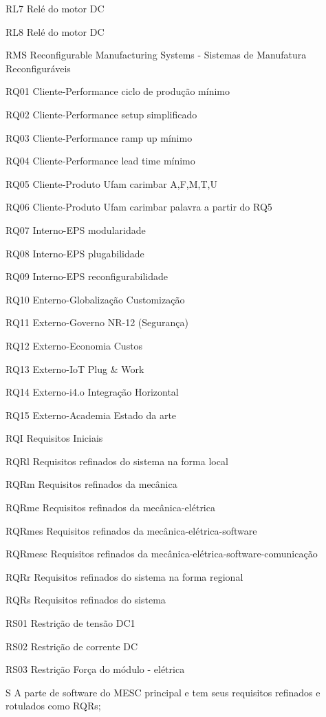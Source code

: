\documentclass[
12pt,				%
openright,			%
oneside,			%
a4paper,			%
english,			%
brazil				%
]{abntex2}
\begin{document}
\begin{siglas}
\item[RL7] Relé do motor DC
\item[RL8] Relé do motor DC
\item[RMS] Reconfigurable Manufacturing Systems - Sistemas de Manufatura Reconfiguráveis
\item[RQ01] Cliente-Performance ciclo de produção mínimo 
\item[RQ02] Cliente-Performance setup simplificado 
\item[RQ03] Cliente-Performance ramp up mínimo 
\item[RQ04] Cliente-Performance lead time mínimo 
\item[RQ05] Cliente-Produto Ufam carimbar A,F,M,T,U 
\item[RQ06] Cliente-Produto Ufam carimbar palavra a partir do RQ5 
\item[RQ07] Interno-EPS modularidade 
\item[RQ08] Interno-EPS plugabilidade 
\item[RQ09] Interno-EPS reconfigurabilidade 
\item[RQ10] Enterno-Globalização Customização 
\item[RQ11] Externo-Governo NR-12 (Segurança)
\item[RQ12] Externo-Economia Custos 
\item[RQ13] Externo-IoT Plug \& Work 
\item[RQ14] Externo-i4.o Integração Horizontal 
\item[RQ15] Externo-Academia Estado da arte 
\item[RQI] Requisitos Iniciais
\item[RQRl] Requisitos refinados do sistema na forma local
\item[RQRm] Requisitos refinados da mecânica
\item[RQRme] Requisitos refinados da mecânica-elétrica
\item[RQRmes] Requisitos refinados da mecânica-elétrica-software
\item[RQRmesc] Requisitos refinados da mecânica-elétrica-software-comunicação
\item[RQRr] Requisitos refinados do sistema na forma regional
\item[RQRs] Requisitos refinados do sistema 
\item[RS01] Restrição de tensão DC1
\item[RS02] Restrição de corrente DC 
\item[RS03] Restrição Força do módulo - elétrica
\item[S] A parte de software do MESC principal e tem seus requisitos refinados e rotulados como RQRs;

\end{siglas}
\end{document}
